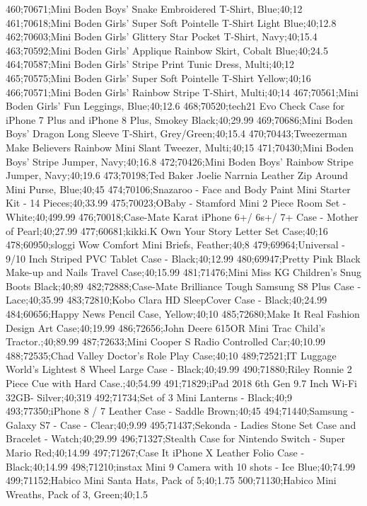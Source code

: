 460;70671;Mini Boden Boys' Snake Embroidered T-Shirt, Blue;40;12
461;70618;Mini Boden Girls' Super Soft Pointelle T-Shirt Light Blue;40;12.8
462;70603;Mini Boden Girls' Glittery Star Pocket T-Shirt, Navy;40;15.4
463;70592;Mini Boden Girls' Applique Rainbow Skirt, Cobalt Blue;40;24.5
464;70587;Mini Boden Girls' Stripe Print Tunic Dress, Multi;40;12
465;70575;Mini Boden Girls' Super Soft Pointelle T-Shirt Yellow;40;16
466;70571;Mini Boden Girls' Rainbow Stripe T-Shirt, Multi;40;14
467;70561;Mini Boden Girls' Fun Leggings, Blue;40;12.6
468;70520;tech21 Evo Check Case for iPhone 7 Plus and iPhone 8 Plus, Smokey Black;40;29.99
469;70686;Mini Boden Boys' Dragon Long Sleeve T-Shirt, Grey/Green;40;15.4
470;70443;Tweezerman Make Believers Rainbow Mini Slant Tweezer, Multi;40;15
471;70430;Mini Boden Boys' Stripe Jumper, Navy;40;16.8
472;70426;Mini Boden Boys' Rainbow Stripe Jumper, Navy;40;19.6
473;70198;Ted Baker Joelie Narrnia Leather Zip Around Mini Purse, Blue;40;45
474;70106;Snazaroo - Face and Body Paint Mini Starter Kit - 14 Pieces;40;33.99
475;70023;OBaby - Stamford Mini 2 Piece Room Set - White;40;499.99
476;70018;Case-Mate Karat iPhone 6+/ 6s+/ 7+ Case - Mother of Pearl;40;27.99
477;60681;kikki.K Own Your Story Letter Set Case;40;16
478;60950;sloggi Wow Comfort Mini Briefs, Feather;40;8
479;69964;Universal - 9/10 Inch Striped PVC Tablet Case - Black;40;12.99
480;69947;Pretty Pink Black Make-up and Nails Travel Case;40;15.99
481;71476;Mini Miss KG Children's Snug Boots Black;40;89
482;72888;Case-Mate Brilliance Tough Samsung S8 Plus Case - Lace;40;35.99
483;72810;Kobo Clara HD SleepCover Case - Black;40;24.99
484;60656;Happy News Pencil Case, Yellow;40;10
485;72680;Make It Real Fashion Design Art Case;40;19.99
486;72656;John Deere 615OR Mini Trac Child's Tractor.;40;89.99
487;72633;Mini Cooper S Radio Controlled Car;40;10.99
488;72535;Chad Valley Doctor's Role Play Case;40;10
489;72521;IT Luggage World's Lightest 8 Wheel Large Case - Black;40;49.99
490;71880;Riley Ronnie 2 Piece Cue with Hard Case.;40;54.99
491;71829;iPad 2018 6th Gen 9.7 Inch Wi-Fi 32GB- Silver;40;319
492;71734;Set of 3 Mini Lanterns - Black;40;9
493;77350;iPhone 8 / 7 Leather Case - Saddle Brown;40;45
494;71440;Samsung - Galaxy S7 - Case - Clear;40;9.99
495;71437;Sekonda - Ladies Stone Set Case and Bracelet - Watch;40;29.99
496;71327;Stealth Case for Nintendo Switch - Super Mario Red;40;14.99
497;71267;Case It iPhone X Leather Folio Case - Black;40;14.99
498;71210;instax Mini 9 Camera with 10 shots - Ice Blue;40;74.99
499;71152;Habico Mini Santa Hats, Pack of 5;40;1.75
500;71130;Habico Mini Wreaths, Pack of 3, Green;40;1.5
